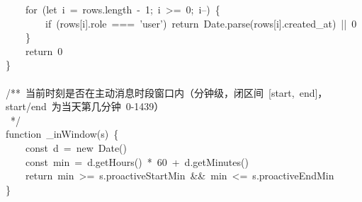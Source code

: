 \documentclass[a4paper,10pt]{article}
\begin{document}
{~~~~for~(let~i~=~rows.length~-~1;~i~>=~0;~i--)~\{\\
~~~~~~~~if~(rows[i].role~===~'user')~return~Date.parse(rows[i].created\_at)~||~0\\
~~~~\}\\
~~~~return~0\\
\}\\
\mbox{}\\
/**~当前时刻是否在主动消息时段窗口内（分钟级，闭区间~[start,~end]，start/end~为当天第几分钟~0-1439）\\
~*/\\
function~\_inWindow(s)~\{\\
~~~~const~d~=~new~Date()\\
~~~~const~min~=~d.getHours()~*~60~+~d.getMinutes()\\
~~~~return~min~>=~s.proactiveStartMin~\&\&~min~<=~s.proactiveEndMin\\
\}\\
\mbox{}
}

\newpage
\end{document}
